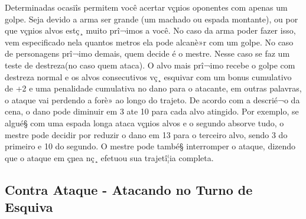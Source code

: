Determinadas ocasiîs permitem você acertar vçµios oponentes com apenas um golpe. Seja devido a arma ser grande (um machado ou espada montante), ou por que vçµios alvos estç¸ muito prî¬imos a você. No caso da arma poder fazer isso, vem especificado nela quantos metros ela pode alcanè»r com um golpe. No caso de personagens prî¬imo demais, quem decide é o mestre. Nesse caso se faz um teste de destreza(no caso quem ataca). O alvo mais prî¬imo recebe o golpe com destreza normal e os alvos consecutivos vç¸ esquivar com um bonus cumulativo de +2 e uma penalidade cumulativa no dano para o atacante, em outras palavras, o ataque vai perdendo a forè» ao longo do trajeto. De acordo com a descrié¬o da cena, o dano pode diminuir em 3 ate 10 para cada alvo atingido. Por exemplo, se algué§ com uma espada longa ataca vçµios alvos e o segundo absorve tudo, o mestre pode decidir por reduzir o dano em 13 para o terceiro alvo, sendo 3 do primeiro e 10 do segundo. O mestre pode també§ interromper o ataque, dizendo que o ataque em çµea nç¸ efetuou sua trajetî¦ia completa. 

\subsection{Contra Ataque - Atacando no Turno de Esquiva}

